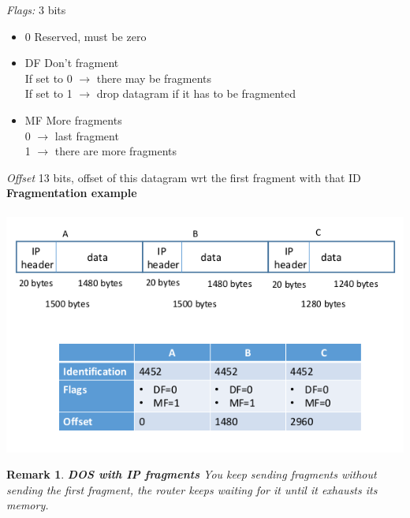 \documentclass[10pt,a4paper]{book}
\newtheorem{remark}{Remark}
\begin{document}
\emph{Flags:} 3 bits
\begin{itemize}
\item 0 Reserved, must be zero
\item DF Don't fragment\\
If set to 0 $\to$ there may be fragments\\
If set to 1 $\to$ drop datagram if it has to be fragmented
\item MF More fragments\\
0 $\to$ last fragment\\
1 $\to$ there are more fragments
\end{itemize}
\emph{Offset} 13 bits, offset of this datagram wrt the first fragment with that ID
\newpage
\textbf{Fragmentation example}\\\\
\includegraphics[scale=0.6]{fragmentation.png}\\
\begin{remark}
\textbf{DOS with IP fragments}
You keep sending fragments without sending the first fragment, the router keeps waiting for it until it exhausts its memory.
\end{remark}
\newpage
\end{document}
